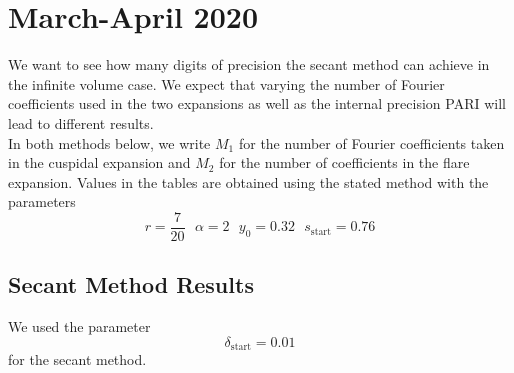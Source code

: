 \documentclass[]{article}
\begin{document}
\section*{March-April 2020}

We want to see how many digits of precision the secant method can achieve in the infinite volume case.
We expect that varying the number of Fourier coefficients used in the two expansions as well as the internal precision PARI will lead to different results.
\\

In both methods below, we write $M_1$ for the number of Fourier coefficients taken in the cuspidal expansion and $M_2$ for the number of coefficients in the flare expansion.
Values in the tables are obtained using the stated method with the parameters
$$
r=\frac{7}{20} ~~~ \alpha=2 ~~~ y_0=0.32 ~~~ s_{\text{start}} = 0.76
$$

\subsection*{Secant Method Results}

We used the parameter
$$
\delta_{\text{start}} = 0.01
$$
for the secant method.
\end{document}

